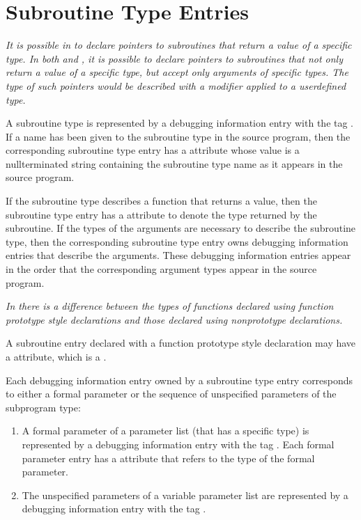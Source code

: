 \section{Subroutine Type Entries}
\label{chap:subroutinetypeentries}

\textit{It is possible in 
to declare pointers to subroutines
that return a value of a specific type. In both 
 and ,
it is possible to declare pointers to subroutines that not
only return a value of a specific type, but accept only
arguments of specific types. The type of such pointers would
be described with a  modifier applied to a
user\dash defined type.}

A subroutine type is represented by a debugging information
entry with the 
tag \DWTAGsubroutinetypeTARG. 
If a name has
been given to the subroutine type in the source program,
then the corresponding subroutine type entry has 
a \DWATname{} attribute 
whose value is a null\dash terminated string containing
the subroutine type name as it appears in the source program.

If the subroutine type describes a function that returns
a value, then the subroutine type entry has 
a \DWATtype{}
attribute to denote the type returned by the subroutine. If
the types of the arguments are necessary to describe the
subroutine type, then the corresponding subroutine type
entry owns debugging information entries that describe the
arguments. These debugging information entries appear in the
order that the corresponding argument types appear in the
source program.

\textit{In  there 
is a difference between the types of functions
declared using function prototype style declarations and
those declared using non\dash prototype declarations.}

A 
\hypertarget{chap:DWATprototypedsubroutineprototype}{}
subroutine entry declared with a function prototype style
declaration may have 
a 
\DWATprototypedDEFN{} attribute, which is
a .

Each debugging information entry owned by a subroutine
type entry corresponds to either a formal parameter or the sequence of
unspecified parameters of the subprogram type:

\begin{enumerate}[1. ]
\item A formal parameter of a parameter list (that has a
specific type) is represented by a debugging information entry
with the tag \DWTAGformalparameter. 
Each formal parameter
entry has 
a \DWATtype{} attribute that refers to the type of
the formal parameter.

\item The unspecified parameters of a variable parameter list
are 
represented by a debugging information entry with the
tag \DWTAGunspecifiedparameters.
\end{enumerate}

